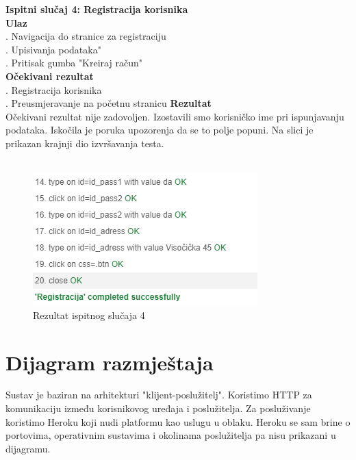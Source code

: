 {			 \noindent \textbf{Ispitni slučaj 4: Registracija korisnika}
			 \\
			 \textbf{Ulaz}
			 \\
			 . Navigacija do stranice za registraciju \\
			 . Upisivanja podataka" \\
			 . Pritisak gumba "Kreiraj račun" \\
			 \textbf{Očekivani rezultat}
			 \\
			 . Registracija korisnika\\
			 . Preusmjeravanje na početnu stranicu
			 \textbf{Rezultat}
			 \\
			 \indent Očekivani rezultat nije zadovoljen. Izostavili smo korisničko ime pri ispunjavanju podataka. Iskočila je poruka upozorenja da se to polje popuni. Na slici je prikazan krajnji dio izvršavanja testa.
			 \\ \\
			 \begin{figure}[H]
			 	\centering
			 	\includegraphics[scale=0.7]{"slike/test10"}
			 	\caption{Rezultat ispitnog slučaja 4}
			 	\label{fig:rezultat-ispitnog-slucaja-10}
			 \end{figure}
		
		\eject
		
		\section{Dijagram razmještaja}
			
			Sustav je baziran na arhitekturi "klijent-poslužitelj". Koristimo HTTP za komunikaciju između korisnikovog uređaja i poslužitelja. Za posluživanje koristimo Heroku koji nudi platformu kao uslugu u oblaku. Heroku se sam brine o portovima, operativnim sustavima i okolinama poslužitelja pa nisu prikazani u dijagramu.
			
}
